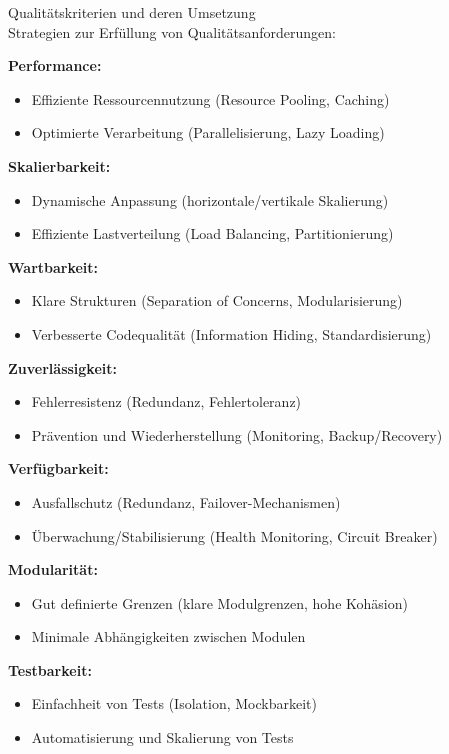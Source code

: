\begin{corollary}{Qualitätskriterien und deren Umsetzung}\\
Strategien zur Erfüllung von Qualitätsanforderungen:

\textbf{Performance:}
\begin{itemize}
    \item Effiziente Ressourcennutzung (Resource Pooling, Caching)
    \item Optimierte Verarbeitung (Parallelisierung, Lazy Loading)
\end{itemize}

\textbf{Skalierbarkeit:}
\begin{itemize}
    \item Dynamische Anpassung (horizontale/vertikale Skalierung)
    \item Effiziente Lastverteilung (Load Balancing, Partitionierung)
\end{itemize}

\textbf{Wartbarkeit:}
\begin{itemize}
    \item Klare Strukturen (Separation of Concerns, Modularisierung)
    \item Verbesserte Codequalität (Information Hiding, Standardisierung)
\end{itemize}

\textbf{Zuverlässigkeit:}
\begin{itemize}
    \item Fehlerresistenz (Redundanz, Fehlertoleranz)
    \item Prävention und Wiederherstellung (Monitoring, Backup/Recovery)
\end{itemize}

\textbf{Verfügbarkeit:}
\begin{itemize}
    \item Ausfallschutz (Redundanz, Failover-Mechanismen)
    \item Überwachung/Stabilisierung (Health Monitoring, Circuit Breaker)
\end{itemize}

\textbf{Modularität:}
\begin{itemize}
    \item Gut definierte Grenzen (klare Modulgrenzen, hohe Kohäsion)
    \item Minimale Abhängigkeiten zwischen Modulen
\end{itemize}

\textbf{Testbarkeit:}
\begin{itemize}
    \item Einfachheit von Tests (Isolation, Mockbarkeit)
    \item Automatisierung und Skalierung von Tests
\end{itemize}


\end{corollary}
